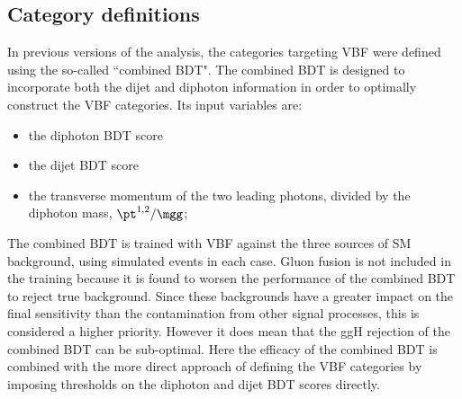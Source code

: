\subsection{Category definitions}

In previous versions of the analysis, 
the categories targeting VBF were defined using the so-called ``combined BDT".
The combined BDT is designed to incorporate both the dijet and diphoton information 
in order to optimally construct the VBF categories.
Its input variables are:
\begin{itemize}
\item the diphoton BDT score
\item the dijet BDT score
\item the transverse momentum of the two leading photons, divided by the diphoton mass, $\pt^{1,2}/\mgg$;
\end{itemize}
The combined BDT is trained with VBF against the three sources of SM background, 
using simulated events in each case.
Gluon fusion is not included in the training because it is found to worsen the performance 
of the combined BDT to reject true background.
Since these backgrounds have a greater impact on the final sensitivity 
than the contamination from other signal processes, 
this is considered a higher priority.
However it does mean that the ggH rejection of the combined BDT can be sub-optimal.
Here the efficacy of the combined BDT is combined with the more direct approach of 
defining the VBF categories by imposing thresholds on the diphoton and dijet BDT scores directly.

